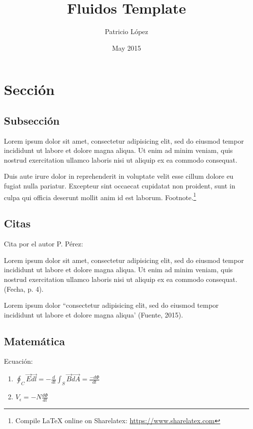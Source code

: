 \documentclass[12pt, letterpaper]{article}
\title{Fluidos Template}
\author{Patricio López}
\date{May 2015}
\begin{document}
\section{Sección}

\subsection{Subsección}

Lorem ipsum dolor sit amet, consectetur adipisicing elit, sed do eiusmod
tempor incididunt ut labore et dolore magna aliqua. Ut enim ad minim veniam,
quis nostrud exercitation ullamco laboris nisi ut aliquip ex ea commodo
consequat.

\medskip

Duis aute irure dolor in reprehenderit in voluptate velit esse
cillum dolore eu fugiat nulla pariatur. Excepteur sint occaecat cupidatat non
proident, sunt in culpa qui officia deserunt mollit anim id est laborum. Footnote.\footnote{Compile LaTeX online on Sharelatex: \url{https://www.sharelatex.com}}


\subsection{Citas}

Cita por el autor P. Pérez:
\medskip
\begin{adjustwidth}{2cm}{}
    Lorem ipsum dolor sit amet, consectetur adipisicing elit, sed do eiusmod
    tempor incididunt ut labore et dolore magna aliqua. Ut enim ad minim veniam,
    quis nostrud exercitation ullamco laboris nisi ut aliquip ex ea commodo
    consequat. (Fecha, p. 4).
\end{adjustwidth}

\medskip

Lorem ipsum dolor ``consectetur adipisicing elit, sed do eiusmod tempor incididunt ut labore et dolore magna aliqua' (Fuente, 2015).

\subsection{Matemática}

Ecuación:
\begin{enumerate}
\item $\oint_C \! \stackrel{\rightarrow}{E} \stackrel{\rightarrow}{dl} = -\frac{d}{dt} \int_S \stackrel{\rightarrow}{B}\stackrel{\rightarrow}{dA} = \frac{-d\Phi}{dt}$
\item $V_\epsilon = -N\frac{d\Phi}{dt}$
\end{enumerate}
\end{document}
